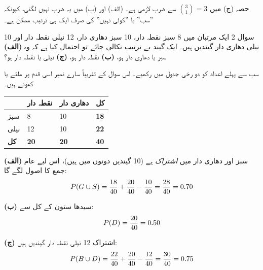 \begin{ghalti}
حصہ (ج) میں \(\binom{3}{1}=3\) سے ضرب لازمی ہے۔ (الف) اور (ب) میں یہ ضرب نہیں
لگتی، کیونکہ ''سب'' یا ''کوئی نہیں'' کی صرف ایک ہی ترتیب ممکن ہے۔
\end{ghalti}

\begin{sawal}{سوال \textenglish{2}}
ایک مرتبان میں \textenglish{8} سبز نقطہ دار، \textenglish{10} سبز دھاری دار،
\textenglish{12} نیلی نقطہ دار اور \textenglish{10} نیلی دھاری دار گیندیں ہیں۔
ایک گیند بے ترتیب نکالی جائے تو احتمال کیا ہے کہ وہ
\textbf{(الف)} سبز یا دھاری دار ہو، \textbf{(ب)} نقطہ دار ہو،
\textbf{(ج)} نیلی یا نقطہ دار ہو؟
\end{sawal}

\begin{hal}
سب سے پہلے اعداد کو دو رخی جدول میں رکھیے۔ اس سوال کے تقریباً سارے نمبر اسی قدم
پر ملتے یا کھوتے ہیں۔

\medskip
\begin{center}
\begin{tabular}{@{}p{2.6cm} p{2.4cm} p{2.4cm} p{2.0cm}@{}}
\toprule
 & \textbf{نقطہ دار} & \textbf{دھاری دار} & \textbf{کل} \\
\midrule
سبز  & \textenglish{8}  & \textenglish{10} & \textbf{\textenglish{18}} \\
نیلی & \textenglish{12} & \textenglish{10} & \textbf{\textenglish{22}} \\
\midrule
\textbf{کل} & \textbf{\textenglish{20}} & \textbf{\textenglish{20}} & \textbf{\textenglish{40}} \\
\bottomrule
\end{tabular}
\end{center}

\medskip
\textbf{(الف)} سبز اور دھاری دار میں \emph{اشتراک} ہے (\textenglish{10} گیندیں
دونوں میں ہیں)، اس لیے عام جمع کا اصول لگے گا:
\[
P\!\left(G\cup S\right)=\frac{18}{40}+\frac{20}{40}-\frac{10}{40}=\frac{28}{40}=0.70
\]

\textbf{(ب)} سیدھا ستون کے کل سے:
\[
P\!\left(D\right)=\frac{20}{40}=0.50
\]

\textbf{(ج)} اشتراک \textenglish{12} نیلی نقطہ دار گیندیں ہیں:
\[
P\!\left(B\cup D\right)=\frac{22}{40}+\frac{20}{40}-\frac{12}{40}=\frac{30}{40}=0.75
\]


\end{hal}

